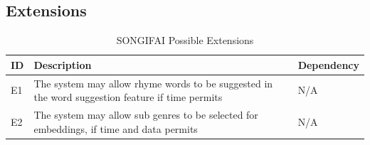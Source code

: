\subsection{Extensions}
\begin{table}[ht]
	\centering
	\begin{tabular}{ | l | p{10cm} | l | }
		\hline
		\textbf{ID} & \textbf{Description} & \textbf{Dependency} \\ \hline
		E1 & The system may allow rhyme words to be suggested in the word suggestion feature if time permits& N/A \\ \hline
		E2 & The system may allow sub genres to be selected for embeddings, if time and data permits& N/A \\ \hline
	\end{tabular}
	\label{Tab:Tcr}
	\caption[Possible Extensions]{SONGIFAI Possible Extensions}
\end{table}


